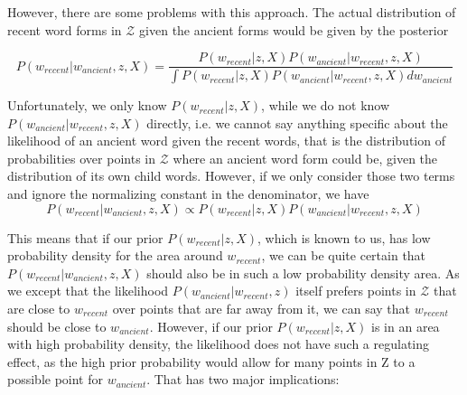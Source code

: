 \documentclass[8pt]{article}
\begin{document}
However, there are some problems with this approach.
The actual distribution of recent word forms in $\mathcal{Z}$ given the ancient forms would be given by the posterior

\begin{equation}
P(w_{recent}|w_{ancient},z,X) = \frac{P(w_{recent}|z,X)P(w_{ancient}|w_{recent},z,X)}{\int P(w_{recent}|z,X)P(w_{ancient}|w_{recent},z,X) dw_{ancient}}
\end{equation}

Unfortunately, we only know $P(w_{recent}|z,X)$, while we do not know $P(w_{ancient}|w_{recent},z,X)$ directly, i.e. we cannot say anything specific about the likelihood of an ancient word given the recent words, that is the distribution of probabilities over points in $\mathcal{Z}$ where an ancient word form could be, given the distribution of its own child words.
However, if we only consider those two terms and ignore the normalizing constant in the denominator, we have
\begin{equation}
P(w_{recent}|w_{ancient},z,X) \propto P(w_{recent}|z,X)P(w_{ancient}|w_{recent},z,X)
\end{equation}


This means that if our prior $P(w_{recent}|z,X)$, which is known to us, has low probability density for the area around $w_{recent}$, we can be quite certain that $P(w_{recent}|w_{ancient},z,X)$ should also be in such a low probability density area. As we except that the likelihood  $P(w_{ancient}|w_{recent},z)$ itself prefers points in $\mathcal{Z}$ that are close to $w_{recent}$ over points that are far away from it, we can say that $w_{recent}$ should be close to $w_{ancient}$. 
However, if our prior $P(w_{recent}|z,X)$ is in an area with high probability density, the likelihood does not have such a regulating effect, as the high prior probability would allow for many points in Z to a possible point for $w_{ancient}$. 
That has two major implications:
\end{document}

